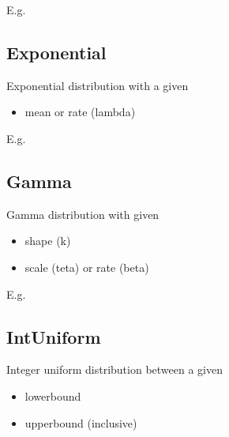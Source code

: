 \documentclass[letterpaper,10pt,english]{sphinxmanual}
\begin{document}
E.g.

\begin{sphinxVerbatim}[commandchars=\\\{\}]
     
\end{sphinxVerbatim}


\subsection{Exponential}
\label{\detokenize{Distributions:exponential}}
Exponential distribution with a given
\begin{itemize}
\item {} 
mean or rate (lambda)

\end{itemize}

E.g.

\begin{sphinxVerbatim}[commandchars=\\\{\}]
    
\end{sphinxVerbatim}


\subsection{Gamma}
\label{\detokenize{Distributions:gamma}}
Gamma distribution with given
\begin{itemize}
\item {} 
shape (k)

\item {} 
scale (teta) or rate (beta)

\end{itemize}

E.g.

\begin{sphinxVerbatim}[commandchars=\\\{\}]
    
\end{sphinxVerbatim}


\subsection{IntUniform}
\label{\detokenize{Distributions:intuniform}}
Integer uniform distribution between a given
\begin{itemize}
\item {} 
lowerbound

\item {} 
upperbound (inclusive)

\end{itemize}
\end{document}
